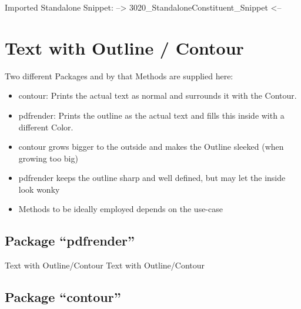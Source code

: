 \np
Imported Standalone Snippet: -->
{3020_StandaloneConstituent_Snippet}
<--


\section{Text with Outline / Contour}
Two different Packages and by that Methods are supplied here:
\begin{itemize}
	\item contour: Prints the actual text as normal and surrounds it with the Contour.
	\item pdfrender: Prints the outline as the actual text and fills this inside with a different Color.
\end{itemize}

\begin{itemize}[labsigA]
	\item contour grows bigger to the outside and makes the Outline sleeked (when growing too big)
	\item pdfrender keeps the outline sharp and well defined, but may let the inside look wonky
\end{itemize}

\begin{itemize}[labsigB]
	\item Methods to be ideally employed depends on the use-case
\end{itemize}

\subsection{Package \enquote{pdfrender}}
{%
	\Huge%
	\sffamily%
	{Text with Outline/Contour}\nl%
	{Text with Outline/Contour}%
}%

\subsection{Package \enquote{contour}}
{%
	\LARGE%
	\contourlength{\DenKrOutlineWidth}%
	\nl%
	{%
		\contourlength{0.2em}%
		\nl%
	}%
}%

